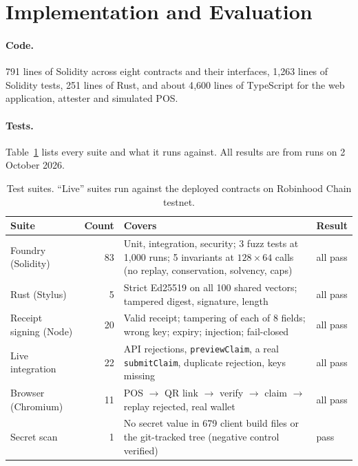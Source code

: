 \documentclass[10.5pt,letterpaper]{article}
\theoremstyle{definition}
\theoremstyle{remark}
\newcommand{\ttt}[1]{\texttt{#1}}
\begin{document}
\section{Implementation and Evaluation}\label{sec:eval}

\paragraph{Code.} 791 lines of Solidity across eight contracts and their interfaces, 1{,}263 lines of Solidity tests,
251 lines of Rust, and about 4{,}600 lines of TypeScript for the web application, attester and simulated POS.

\paragraph{Tests.} Table~\ref{tab:tests} lists every suite and what it runs against. All results are from runs on 2 October 2026.

\begin{table}[!htb]
\centering\small
\caption{Test suites. ``Live'' suites run against the deployed contracts on Robinhood Chain testnet.}
\label{tab:tests}
\begin{tabularx}{\textwidth}{@{}l r >{\raggedright\arraybackslash}X l@{}}
\toprule
Suite & Count & Covers & Result\\
\midrule
Foundry (Solidity) & 83 & Unit, integration, security; 3 fuzz tests at 1{,}000 runs; 5 invariants at $128\times64$ calls (no replay, conservation, solvency, caps) & all pass\\
Rust (Stylus) & 5 & Strict Ed25519 on all 100 shared vectors; tampered digest, signature, length & all pass\\
Receipt signing (Node) & 20 & Valid receipt; tampering of each of 8 fields; wrong key; expiry; injection; fail-closed & all pass\\
Live integration & 22 & API rejections, \ttt{previewClaim}, a real \ttt{submitClaim}, duplicate rejection, keys missing & all pass\\
Browser (Chromium) & 11 & POS $\to$ QR link $\to$ verify $\to$ claim $\to$ replay rejected, real wallet & all pass\\
Secret scan & 1 & No secret value in 679 client build files or the git-tracked tree (negative control verified) & pass\\
\bottomrule
\end{tabularx}
\end{table}
\end{document}
